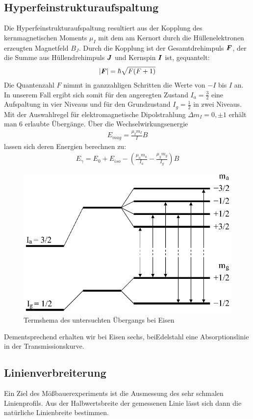 \documentclass[12pt]{article}
\renewcommand*\vec[1]{{\mbox{\boldmath\ensuremath{#1}}}}
\begin{document}
\subsection{Hyperfeinstrukturaufspaltung}
Die Hyperfeinstrukturaufspaltung resultiert aus der Kopplung des kernmagnetischen Moments $\mu_I$ mit dem am Kernort durch die Hüllenelektronen erzeugten Magnetfeld $B_J$.
Durch die Kopplung ist der Gesamtdrehimpuls $\vec{F}$, der die Summe aus Hüllendrehimpuls $\vec{J}$ und Kernspin $\vec{I}$ ist, gequantelt:
\begin{align}
 \left|\vec{F}\right| = \hbar \sqrt{F(F+1)}
\end{align}
Die Quantenzahl $F$ nimmt in ganzzahligen Schritten die Werte von $-I$ bis $I$ an.
In unserem Fall ergibt sich somit für den angeregten Zustand $I_a = \frac{3}{2}$ eine Aufspaltung in vier Niveaus und für den Grundzustand $I_g = \frac{1}{2}$ in zwei Niveaus.
Mit der Auswahlregel für elektromagnetische Dipolstrahlung $\Delta m_I = 0, \pm 1$ erhält man $6$ erlaubte Übergänge. Über die Wechselwirkungsenergie
\begin{align}
 E_{mag} = \frac{\mu_I m_I}{I} B
\end{align}
lassen sich deren Energien berechnen zu:
\begin{align}
 E_\gamma = E_0 + E_{iso} - \left(\frac{\mu_a m_a}{I_a} - \frac{\mu_g m_g}{I_g} \right) B
\label{hfs}
\end{align}
\begin{figure}[H]
 \includegraphics[width=0.9\linewidth]{pictures/termshema_eisen.eps}
 \caption{Termshema des untersuchten Übergangs bei Eisen}
\label{eisen_term}
\end{figure}
Dementsprechend erhalten wir bei Eisen sechs, beiEdelstahl eine Absorptionslinie in der Transmissionskurve.
\subsection{Linienverbreiterung}
\label{linienverbreiterung}
Ein Ziel des Mößbauerexperiments ist die Ausmessung des sehr schmalen Linienprofils. Aus der Halbwertsbreite der gemessenen Linie lässt sich dann die natürliche Linienbreite bestimmen.
\end{document}
